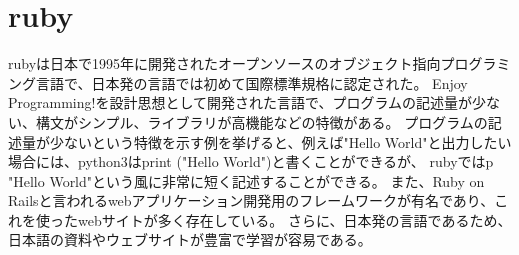 \section{ruby}
rubyは日本で1995年に開発されたオープンソースのオブジェクト指向プログラミング言語で、日本発の言語では初めて国際標準規格に認定された。
Enjoy Programming!を設計思想として開発された言語で、プログラムの記述量が少ない、構文がシンプル、ライブラリが高機能などの特徴がある。
プログラムの記述量が少ないという特徴を示す例を挙げると、例えば"Hello World"と出力したい場合には、python3はprint ("Hello World")と書くことができるが、
rubyではp "Hello World"という風に非常に短く記述することができる。
また、Ruby on Railsと言われるwebアプリケーション開発用のフレームワークが有名であり、これを使ったwebサイトが多く存在している。
さらに、日本発の言語であるため、日本語の資料やウェブサイトが豊富で学習が容易である。